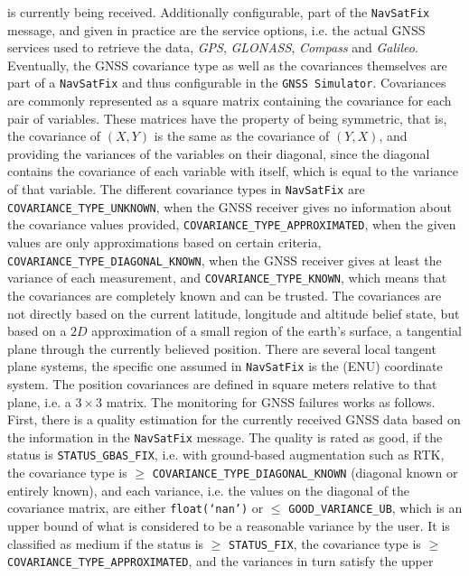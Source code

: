 \documentclass[english, master, utf8]{base/thesis_KBS}
\newcommand{\code}[1]{\colorbox{light-gray}{\texttt{#1}}}
\begin{document}
is currently being received. Additionally configurable, part of the \code{NavSatFix} message, and given in practice are the service options, i.e. the actual GNSS services used to
retrieve the data, \textit{GPS}, \textit{GLONASS}, \textit{Compass} and \textit{Galileo}. Eventually, the GNSS covariance type as well as the covariances themselves are part of a
\code{NavSatFix} and thus configurable in the \code{GNSS Simulator}. Covariances are commonly represented as a square matrix containing the covariance for each pair of variables.
These matrices have the property of being symmetric, that is, the covariance of $(X, Y)$ is the same as the covariance of $(Y, X)$, and providing the variances of the variables on
their diagonal, since the diagonal contains the covariance of each variable with itself, which is equal to the variance of that variable. The different covariance types in 
\code{NavSatFix} are \code{COVARIANCE\_TYPE\_UNKNOWN}, when the GNSS receiver gives no information about the covariance values provided, \code{COVARIANCE\_TYPE\_APPROXIMATED}, when
the given values are only approximations based on certain criteria, \code{COVARIANCE\_TYPE\_DIAGONAL\_KNOWN}, when the GNSS receiver gives at least the variance of each measurement,
and \code{COVARIANCE\_TYPE\_KNOWN}, which means that the covariances are completely known and can be trusted. The covariances are not directly based on the current latitude,
longitude and altitude belief state, but based on a $2D$ approximation of a small region of the earth's surface, a tangential plane through the currently believed position.
There are several local tangent plane systems, the specific one assumed in \code{NavSatFix} is the  (ENU) coordinate system. The position covariances are
defined in square meters relative to that plane, i.e. a $3 \times 3$ matrix.\newline
The monitoring for GNSS failures works as follows. First, there is a quality estimation for the currently received GNSS data based on the information in the \code{NavSatFix} message.
The quality is rated as good, if the status is \code{STATUS\_GBAS\_FIX}, i.e. with ground-based augmentation such as RTK, the covariance type is $\geq$ 
\code{COVARIANCE\_TYPE\_DIAGONAL\_KNOWN} (diagonal known or entirely known), and each variance, i.e. the values on the diagonal of the
covariance matrix, are either \code{float(`nan')} or $\leq$ \code{GOOD\_VARIANCE\_UB}, which is an upper bound of what is considered to be a reasonable variance by the user. It is
classified as medium if the status is $\geq$ \code{STATUS\_FIX}, the covariance type is $\geq$ \code{COVARIANCE\_TYPE\_APPROXIMATED}, and the variances in turn satisfy the upper
\end{document}
